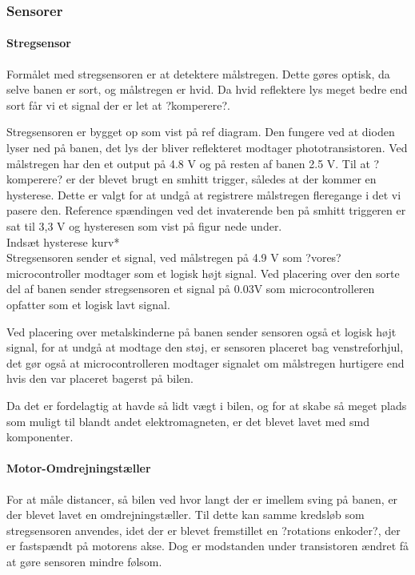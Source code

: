 
\subsubsection{Sensorer}


\paragraph{Stregsensor}
Formålet med stregsensoren er at detektere målstregen. Dette gøres optisk, da selve banen er sort, og målstregen er hvid. Da hvid reflektere lys meget bedre end sort får vi et signal der er let at ?komperere?.

Stregsensoren er bygget op som vist på ref diagram. Den fungere ved at dioden lyser ned på banen, det lys der bliver reflekteret modtager phototransistoren. Ved målstregen har den et output på 4.8 V og på resten af banen 2.5 V. Til at ?komperere? er der blevet brugt en smhitt trigger, således at der kommer en hysterese. Dette er valgt for at undgå at registrere målstregen fleregange i det vi pasere den. Reference spændingen ved det invaterende ben på smhitt triggeren er sat til 3,3 V og hysteresen som vist på figur nede under.
\\
Indsæt hysterese kurv*
\\
Stregsensoren sender et signal, ved målstregen på 4.9 V som ?vores? microcontroller modtager som et logisk højt signal. Ved placering over den sorte del af banen sender stregsensoren et signal på 0.03V som microcontrolleren opfatter som et logisk lavt signal. 

Ved placering over metalskinderne på banen sender sensoren også et logisk højt signal, for at undgå at modtage den støj, er sensoren placeret bag venstreforhjul, det gør også at microcontrolleren modtager signalet om målstregen hurtigere end hvis den var placeret bagerst på bilen. 

Da det er fordelagtig at havde så lidt vægt i bilen, og for at skabe så meget plads som muligt til blandt andet elektromagneten, er det blevet lavet med smd komponenter. 


\paragraph{Motor-Omdrejningstæller}

For at måle distancer, så bilen ved hvor langt der er imellem sving på banen, er der blevet lavet en omdrejningstæller. Til dette kan samme kredsløb som stregsensoren anvendes, idet der er blevet fremstillet en ?rotations enkoder?, der er fastspændt på motorens akse. Dog er modstanden under transistoren ændret få at gøre sensoren mindre følsom.   


